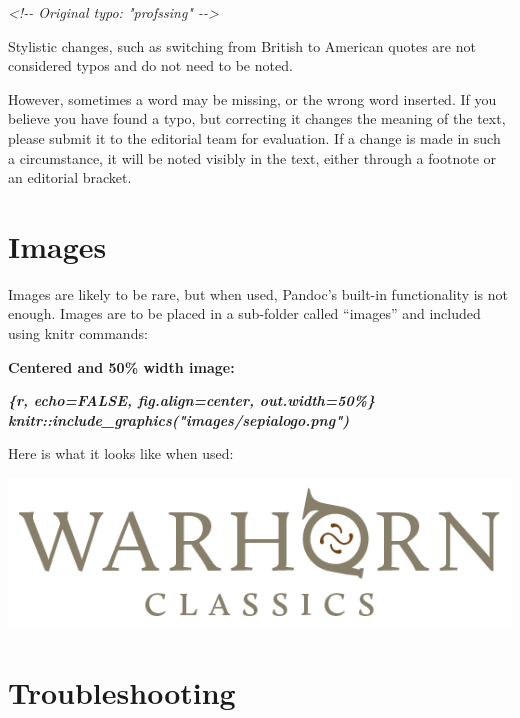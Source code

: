 \documentclass[
  english,
]{book}
\newenvironment{Shaded}{\begin{snugshade}}{\end{snugshade}}
\newcommand{\CommentTok}[1]{\textcolor[rgb]{0.56,0.35,0.01}{\textit{#1}}}
\newcommand{\InformationTok}[1]{\textcolor[rgb]{0.56,0.35,0.01}{\textbf{\textit{#1}}}}
\begin{document}
\begin{Shaded}
\begin{Highlighting}[]
\CommentTok{\textless{}!{-}{-} Original typo: "profssing" {-}{-}\textgreater{}}
\end{Highlighting}
\end{Shaded}

Stylistic changes, such as switching from British to American quotes are not considered typos and do not need to be noted.

However, sometimes a word may be missing, or the wrong word inserted. If you believe you have found a typo, but correcting it changes the meaning of the text, please submit it to the editorial team for evaluation. If a change is made in such a circumstance, it will be noted visibly in the text, either through a footnote or an editorial bracket.

\hypertarget{images}{%
\chapter{Images}\label{images}}

Images are likely to be rare, but when used, Pandoc's built-in functionality is not enough. Images are to be placed in a sub-folder called ``images'' and included using knitr commands:

\textbf{Centered and 50\% width image:}

\begin{Shaded}
\begin{Highlighting}[]
\InformationTok{\textasciigrave{}\textasciigrave{}\textasciigrave{}\{r, echo=FALSE, fig.align=\textquotesingle{}center\textquotesingle{}, out.width=\textquotesingle{}50\%\textquotesingle{}\}}
\InformationTok{knitr::include\_graphics("images/sepialogo.png")}
\InformationTok{\textasciigrave{}\textasciigrave{}\textasciigrave{}}
\end{Highlighting}
\end{Shaded}

Here is what it looks like when used:

\begin{center}\includegraphics[width=0.5\linewidth]{images/sepialogo} \end{center}

\hypertarget{troubleshooting}{%
\chapter{Troubleshooting}\label{troubleshooting}}
\end{document}
